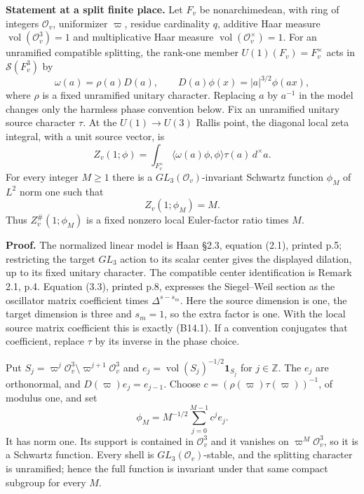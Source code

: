 \documentclass[11pt,a4paper]{article}
\theoremstyle{definition}
\begin{document}
\textbf{Statement at a split finite place.} Let \(F_v\) be nonarchimedean, with ring of integers \(\mathcal O_v\), uniformizer \(\varpi\), residue cardinality \(q\), additive Haar measure \(\operatorname{vol}(\mathcal O_v^3)=1\) and multiplicative Haar measure \(\operatorname{vol}(\mathcal O_v^\times)=1\). For an unramified compatible splitting, the rank-one member \(U(1)(F_v)=F_v^\times\) acts in \(\mathcal S(F_v^3)\) by \[
 \omega(a)=\rho(a)D(a),\qquad
 D(a)\phi(x)=|a|^{3/2}\phi(ax),
\] where \(\rho\) is a fixed unramified unitary character. Replacing \(a\) by \(a^{-1}\) in the model changes only the harmless phase convention below. Fix an unramified unitary source character \(\tau\). At the \(U(1)\to U(3)\) Rallis point, the diagonal local zeta integral, with a unit source vector, is \[
 Z_v(1;\phi)=\int_{F_v^\times}
       \langle\omega(a)\phi,\phi\rangle\tau(a)\,d^\times a.
\tag{B14.1}
\] For every integer \(M\ge1\) there is a \(GL_3(\mathcal O_v)\)-invariant Schwartz function \(\phi_M\) of \(L^2\) norm one such that \[
 Z_v(1;\phi_M)=M.
\tag{B14.2}
\] Thus \(Z_v^\#(1;\phi_M)\) is a fixed nonzero local Euler-factor ratio times \(M\).

\textbf{Proof.} The normalized linear model is Haan §2.3, equation (2.1), printed p.5; restricting the target \(GL_3\) action to its scalar center gives the displayed dilation, up to its fixed unitary character. The compatible center identification is Remark 2.1, p.4. Equation (3.3), printed p.8, expresses the Siegel--Weil section as the oscillator matrix coefficient times \(\Delta^{s-s_m}\). Here the source dimension is one, the target dimension is three and \(s_m=1\), so the extra factor is one. With the local source matrix coefficient this is exactly (B14.1). If a convention conjugates that coefficient, replace \(\tau\) by its inverse in the phase choice.

Put \(S_j=\varpi^j\mathcal O_v^3\setminus\varpi^{j+1}\mathcal O_v^3\) and \(e_j=\operatorname{vol}(S_j)^{-1/2}\mathbf1_{S_j}\) for \(j\in\mathbb Z\). The \(e_j\) are orthonormal, and \(D(\varpi)e_j=e_{j-1}\). Choose \(c=(\rho(\varpi)\tau(\varpi))^{-1}\), of modulus one, and set \[
 \phi_M=M^{-1/2}\sum_{j=0}^{M-1}c^j e_j.
\] It has norm one. Its support is contained in \(\mathcal O_v^3\) and it vanishes on \(\varpi^M\mathcal O_v^3\), so it is a Schwartz function. Every shell is \(GL_3(\mathcal O_v)\)-stable, and the splitting character is unramified; hence the full function is invariant under that same compact subgroup for every \(M\).
\end{document}
